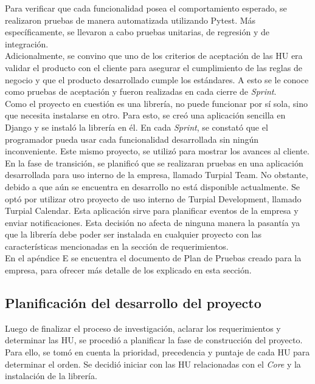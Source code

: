 Para verificar que cada funcionalidad posea el comportamiento esperado, se realizaron pruebas de manera automatizada utilizando Pytest. Más específicamente, se llevaron a cabo pruebas unitarias, de regresión y de integración. \\

Adicionalmente, se convino que uno de los criterios de aceptación de las HU era validar el producto con el cliente para asegurar el cumplimiento de las reglas de negocio y que el producto desarrollado cumple los estándares. A esto se le conoce como pruebas de aceptación y fueron realizadas en cada cierre de \textit{Sprint}.\\

Como el proyecto en cuestión es una librería, no puede funcionar por sí sola, sino que necesita instalarse en otro. Para esto, se creó una aplicación sencilla en Django y se instaló la librería en él. En cada \textit{Sprint}, se constató que el programador pueda usar cada funcionalidad desarrollada  sin ningún inconveniente. Este mismo proyecto, se utilizó para mostrar los avances al cliente. \\

En la fase de transición, se planificó que se realizaran pruebas en una aplicación desarrollada para uso interno de la empresa, llamado Turpial Team. No obstante, debido a que aún se encuentra en desarrollo no está disponible actualmente. Se optó por utilizar otro proyecto de uso interno de Turpial Development, llamado Turpial Calendar. Esta aplicación sirve para planificar eventos de la empresa y enviar notificaciones. Esta decisión no afecta de ninguna manera la pasantía ya que la librería debe poder ser instalada en cualquier proyecto con las características mencionadas en la sección de requerimientos. \\

En el apéndice E se encuentra el documento de  Plan de Pruebas creado para la empresa, para ofrecer más detalle de los explicado en esta sección.\\

\subsection{Planificación del desarrollo del proyecto}

Luego de finalizar el proceso de investigación, aclarar los requerimientos y determinar las HU, se procedió a planificar la fase de construcción del proyecto. Para ello, se tomó en cuenta la prioridad, precedencia y puntaje de cada HU para determinar el orden. Se decidió iniciar con las HU relacionadas con el \textit{Core} y la instalación de la librería.\\

